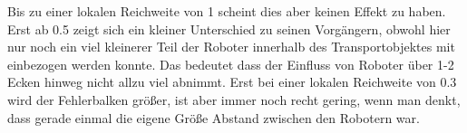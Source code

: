 Bis zu einer lokalen Reichweite von 1 scheint dies aber keinen Effekt zu haben. Erst ab 0.5 zeigt sich ein kleiner Unterschied zu seinen Vorgängern, obwohl hier nur noch ein viel kleinerer Teil der Roboter innerhalb des Transportobjektes mit einbezogen werden konnte. Das bedeutet dass der Einfluss von Roboter über 1-2 Ecken hinweg nicht allzu viel abnimmt. Erst bei einer lokalen Reichweite von 0.3 wird der Fehlerbalken größer, ist aber immer noch recht gering, wenn man denkt, dass gerade einmal die eigene Größe Abstand zwischen den Robotern war.
